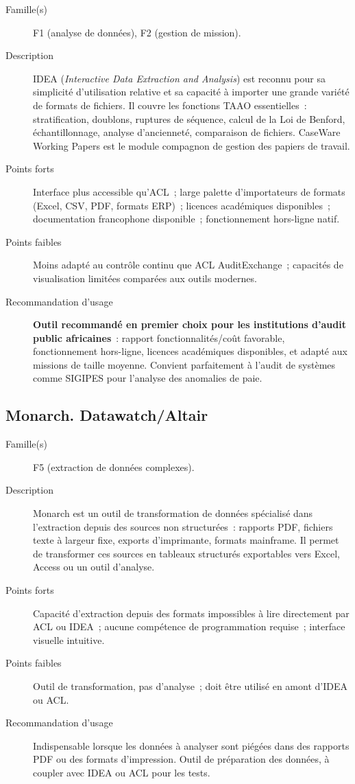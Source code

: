 \begin{description}
  \item[Famille(s)] F1 (analyse de données), F2 (gestion de mission).
  \item[Description] IDEA (\emph{Interactive Data Extraction and Analysis})
        est reconnu pour sa simplicité d'utilisation relative et sa capacité
        à importer une grande variété de formats de fichiers. Il couvre les
        fonctions TAAO essentielles~: stratification, doublons, ruptures de
        séquence, calcul de la Loi de Benford, échantillonnage, analyse
        d'ancienneté, comparaison de fichiers. CaseWare Working Papers est
        le module compagnon de gestion des papiers de travail.
  \item[Points forts] Interface plus accessible qu'ACL~; large palette
        d'importateurs de formats (Excel, CSV, PDF, formats ERP)~; licences
        académiques disponibles~; documentation francophone disponible~;
        fonctionnement hors-ligne natif.
  \item[Points faibles] Moins adapté au contrôle continu que ACL
        AuditExchange~; capacités de visualisation limitées comparées aux
        outils modernes.
  \item[Recommandation d'usage] \textbf{Outil recommandé en premier choix
        pour les institutions d'audit public africaines}~: rapport
        fonctionnalités/coût favorable, fonctionnement hors-ligne, licences
        académiques disponibles, et adapté aux missions de taille moyenne.
        Convient parfaitement à l'audit de systèmes comme SIGIPES pour
        l'analyse des anomalies de paie.
\end{description}

\subsection*{Monarch. Datawatch/Altair}

\begin{description}
  \item[Famille(s)] F5 (extraction de données complexes).
  \item[Description] Monarch est un outil de transformation de données
        spécialisé dans l'extraction depuis des sources non structurées~:
        rapports PDF, fichiers texte à largeur fixe, exports d'imprimante,
        formats mainframe. Il permet de transformer ces sources en tableaux
        structurés exportables vers Excel, Access ou un outil d'analyse.
  \item[Points forts] Capacité d'extraction depuis des formats impossibles
        à lire directement par ACL ou IDEA~; aucune compétence de
        programmation requise~; interface visuelle intuitive.
  \item[Points faibles] Outil de transformation, pas d'analyse~; doit être
        utilisé en amont d'IDEA ou ACL.
  \item[Recommandation d'usage] Indispensable lorsque les données à analyser
        sont piégées dans des rapports PDF ou des formats d'impression. Outil
        de préparation des données, à coupler avec IDEA ou ACL pour les tests.
\end{description}

